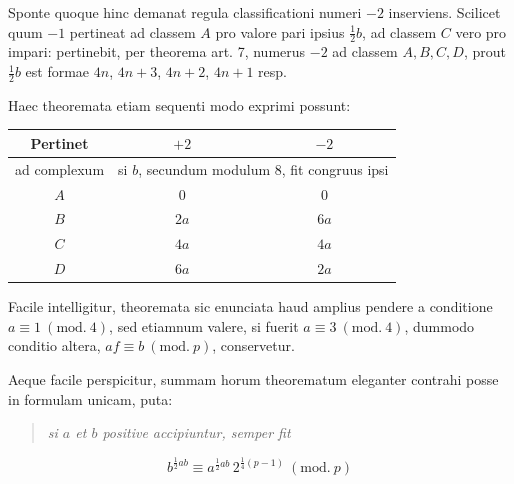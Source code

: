 Sponte quoque hinc demanat regula classificationi numeri $-2$ inserviens. Scilicet quum $-1$ pertineat ad classem $A$ pro valore pari ipsius $\frac12b$, ad classem $C$ vero pro impari: pertinebit, per theorema art. 7, numerus $-2$ ad classem $A,B,C,D$, prout $\frac12b$ est formae $4n$, $4n+3$, $4n+2$, $4n+1$ resp.

Haec theoremata etiam sequenti modo exprimi possunt:

%
\begin{center}
\begin{tabular}{c|c|c}
Pertinet&$+2$&$-2$\\\hline
ad complexum&\multicolumn{2}{c}{si $b$, secundum modulum $8$, fit congruus ipsi}\\\hline
$A$&$0$&$0$\\
$B$&$2a$&$6a$\\
$C$&$4a$&$4a$\\
$D$&$6a$&$2a$
\end{tabular}
\end{center}

Facile intelligitur, theoremata sic enunciata haud amplius pendere a conditione $a\equiv1\ (\mathrm{mod.}\ 4)$, sed etiamnum valere, si fuerit $a\equiv3\ (\mathrm{mod.}\ 4)$, dummodo conditio altera, $af\equiv b\ (\mathrm{mod.}\ p)$, conservetur.

Aeque facile perspicitur, summam horum theorematum eleganter contrahi posse in formulam unicam, puta:
\begin{quote}\itshape si $a$ et $b$ positive accipiuntur, semper fit\end{quote}
\[
b^{\frac12ab}\equiv a^{\frac12ab}\,2^{\frac14(p-1)}\ (\mathrm{mod.}\ p)
\]

